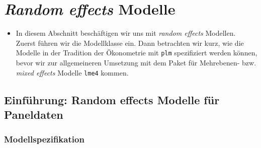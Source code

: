 \documentclass[
]{book}
\providecommand{\tightlist}{%
  \setlength{\itemsep}{0pt}\setlength{\parskip}{0pt}}
\begin{document}
\hypertarget{random-effects-modelle}{%
\chapter{\texorpdfstring{\emph{Random effects} Modelle}{Random effects Modelle}}\label{random-effects-modelle}}

\begin{itemize}
\tightlist
\item
  In diesem Abschnitt beschäftigen wir uns mit \emph{random effects} Modellen. Zuerst führen wir die Modellklasse ein. Dann betrachten wir kurz, wie die Modelle in der Tradition der Ökonometrie mit \texttt{plm} spezifiziert werden können, bevor wir zur allgemeineren Umsetzung mit dem Paket für Mehrebenen- bzw. \emph{mixed effects} Modelle \texttt{lme4} kommen.
\end{itemize}

\hypertarget{einfuxfchrung-random-effects-modelle-fuxfcr-paneldaten}{%
\section{Einführung: Random effects Modelle für Paneldaten}\label{einfuxfchrung-random-effects-modelle-fuxfcr-paneldaten}}

\hypertarget{modellspezifikation}{%
\subsection*{Modellspezifikation}\label{modellspezifikation}}
\end{document}

